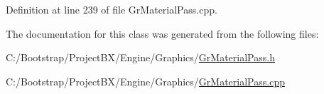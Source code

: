 Definition at line 239 of file GrMaterialPass.cpp.

The documentation for this class was generated from the following files:\begin{CompactItemize}
\item 
C:/Bootstrap/ProjectBX/Engine/Graphics/\hyperlink{_gr_material_pass_8h}{GrMaterialPass.h}\item 
C:/Bootstrap/ProjectBX/Engine/Graphics/\hyperlink{_gr_material_pass_8cpp}{GrMaterialPass.cpp}\end{CompactItemize}
